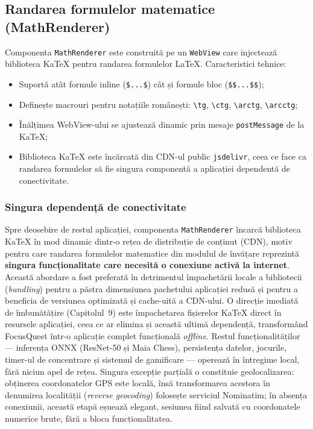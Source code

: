 \documentclass[12pt, a4paper, twoside]{report}
\numberwithin{equation}{section}
\begin{document}
\subsection{Randarea formulelor matematice (MathRenderer)}

Componenta \texttt{MathRenderer} este construită pe un \texttt{WebView} care injectează
biblioteca KaTeX pentru randarea formulelor LaTeX. Caracteristici tehnice:
\begin{itemize}
  \item Suportă atât formule inline (\texttt{\$...\$}) cât și formule bloc (\texttt{\$\$...\$\$});
  \item Definește macrouri pentru notațiile românești: \texttt{\textbackslash tg},
    \texttt{\textbackslash ctg}, \texttt{\textbackslash arctg}, \texttt{\textbackslash arcctg};
  \item Înălțimea WebView-ului se ajustează dinamic prin mesaje
    \texttt{postMessage} de la KaTeX;
  \item Biblioteca KaTeX este încărcată din CDN-ul public \texttt{jsdelivr}, ceea ce face ca
    randarea formulelor să fie singura componentă a aplicației dependentă de conectivitate.
\end{itemize}

\subsubsection{Singura dependență de conectivitate}
\label{sec:online-dependency}

Spre deosebire de restul aplicației, componenta \texttt{MathRenderer} încarcă biblioteca
KaTeX în mod dinamic dintr-o rețea de distribuție de conținut (CDN), motiv pentru care
randarea formulelor matematice din modulul de învățare reprezintă \textbf{singura
funcționalitate care necesită o conexiune activă la internet}. Această abordare a fost
preferată în detrimentul împachetării locale a bibliotecii (\textit{bundling}) pentru a
păstra dimensiunea pachetului aplicației redusă și pentru a beneficia de versiunea
optimizată și cache-uită a CDN-ului. O direcție imediată de îmbunătățire (Capitolul~9)
este împachetarea fișierelor KaTeX direct în resursele aplicației, ceea ce ar elimina
și această ultimă dependență, transformând FocusQuest într-o aplicație complet
funcțională \textit{offline}. Restul funcționalităților — inferența ONNX (ResNet-50 și
Maia Chess), persistența datelor, jocurile, timer-ul de concentrare și sistemul de
gamificare — operează în întregime local, fără niciun apel de rețea. Singura excepție
parțială o constituie geolocalizarea: obținerea coordonatelor GPS este locală, însă
transformarea acestora în denumirea localității (\textit{reverse geocoding}) folosește
serviciul Nominatim; în absența conexiunii, această etapă eșuează elegant, sesiunea
fiind salvată cu coordonatele numerice brute, fără a bloca funcționalitatea.
\end{document}
